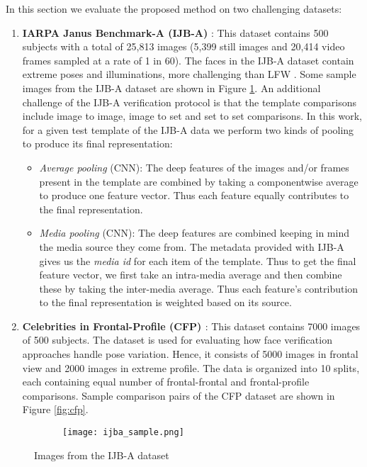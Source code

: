 \documentclass[10pt,twocolumn,letterpaper]{article}
\begin{document}
In this section we evaluate the proposed method on two challenging datasets: 
\begin{enumerate}[leftmargin=*]
\item \textbf{IARPA Janus Benchmark-A (IJB-A)}  \textbf{\cite{ijba15}}: This dataset contains 500
  subjects with a total of 25,813 images (5,399 still images and 20,414 video
  frames sampled at a rate of 1 in 60). The faces in the IJB-A dataset contain
  extreme poses and illuminations, more challenging than LFW \cite{lfw}.  Some sample images from the IJB-A dataset are shown in Figure \ref{fig:ijba-sample}. An additional challenge of the IJB-A verification protocol is that the template comparisons include image to image, image to set and set to set comparisons. In this work, for a given test template of the IJB-A data we perform two kinds of pooling to produce its final representation:

\begin{itemize}[leftmargin=*]
\item  \textit{Average pooling} (CNN): The deep features of the images and/or
  frames present in the template are combined by taking a componentwise average
  to produce one feature vector. Thus each feature equally contributes to the
  final representation. 
\item  \textit{Media pooling} (CNN): The deep features are combined keeping in
  mind the media source they come from. The metadata provided with IJB-A gives
  us the \textit{media id} for each item of the template. Thus to get the final
  feature vector, we first take an intra-media average and then combine these by
  taking the inter-media average. Thus each feature's  contribution to the final
  representation is weighted based on its source.
\end{itemize}

 \item \textbf{Celebrities in Frontal-Profile (CFP) \cite{cfpw}}: This dataset
  contains 7000 images of 500 subjects. The dataset is used for evaluating how
  face verification approaches handle pose variation. Hence, it consists of 5000
  images in frontal view and 2000 images in extreme profile. The data is
  organized into 10 splits, each containing equal number of frontal-frontal and
  frontal-profile comparisons. Sample comparison pairs of the CFP dataset are
  shown in Figure \ref{fig:cfp}.  
\end{enumerate}


\begin{figure}
\begin{subfigure}{.5\textwidth}
\centering
\texttt{[image: ijba\_sample.png]}
\end{subfigure}
\caption{Images from the IJB-A dataset}
\label{fig:ijba-sample}
\end{figure}
  
\end{document}
